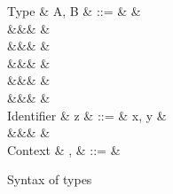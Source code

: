 \begin{figure}[H]
\begin{syntaxfig}
\mbox{Type}
&
A, B
&
::=
&
\tyBool
&
\\
&&&
\tyInt
&
\\
&&&
&
\\
&&&
&
\\
&&&
&
\\
&&&
&
\\[2mm]
\mbox{Identifier}
&
z
&
::=
&
x, y
&
\\
&&&
\primOp
&
\\[2mm]
\mbox{Context}
&
\Gamma, \Delta
&
::=
&
\end{syntaxfig}
\caption{Syntax of types}
\end{figure}

